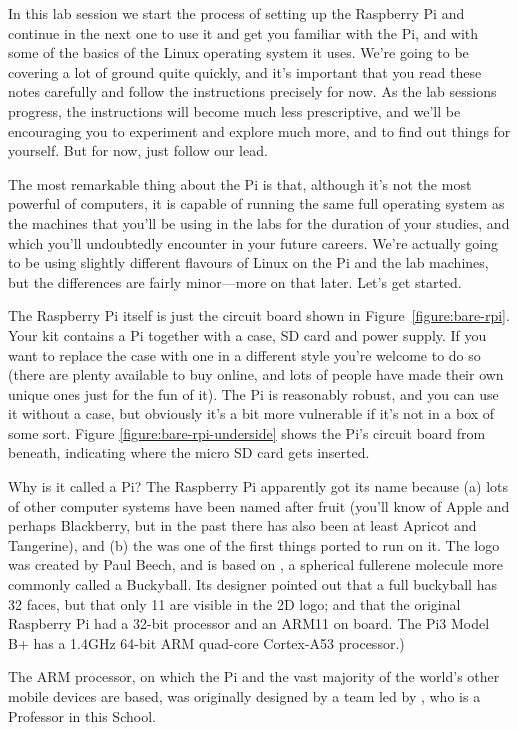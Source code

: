 In this lab session we start the process of setting up the  Raspberry Pi and continue in the next one to use it and get you familiar with the Pi, and with some of the basics of the Linux operating system it uses. We're going to be covering a lot of ground quite quickly, and it's important that you read these notes carefully and follow the instructions precisely for now. As the lab sessions progress, the instructions will become much less prescriptive, and we'll be encouraging you to experiment and explore much more, and to find out things for yourself. But for now, just follow our lead.

The most remarkable thing about the Pi is that, although it's not the most powerful of computers, it is capable of running the same full  operating system as the machines that you'll be using in the labs for the duration of your studies, and which you'll undoubtedly encounter in your future careers. We're actually going to be using slightly different flavours of Linux on the Pi and the lab machines, but the differences are fairly minor---more on that later. Let's get started.

The Raspberry Pi itself is just the circuit board shown in Figure~\ref{figure:bare-rpi}. Your kit contains a Pi together with a case, SD card and power supply. If you want to replace the case with one in a different style you're welcome to do so (there are plenty available to buy online, and lots of people have made their own unique ones just for the fun of it). The Pi is reasonably robust, and you can use it without a case, but obviously it's a bit more vulnerable if it's not in a box of some sort. Figure \ref{figure:bare-rpi-underside} shows the Pi's circuit board from beneath, indicating where the micro SD card gets inserted.

\begin{rpi}{Why is it called a Pi?}
  The Raspberry Pi apparently got its name because (a) lots of other
  computer systems have been named after fruit (you'll know of Apple
  and perhaps Blackberry, but in the past there has also been at least
  Apricot and Tangerine), and (b) the
   was one
  of the first things ported to run on it. The logo was created by
  Paul Beech, and is based on
  , a spherical
  fullerene molecule more commonly called a Buckyball. Its designer
  pointed out that a full buckyball has 32 faces, but that only 11 are
  visible in the 2D logo; and that the original Raspberry Pi had a
  32-bit processor and an ARM11 on board. The Pi3 Model B+ has a
  1.4GHz 64-bit ARM quad-core Cortex-A53 processor.)

The ARM processor, on which the Pi and the vast majority of the world's other mobile devices are based, was originally designed by a team led by , who is a Professor in this School.
\end{rpi}

